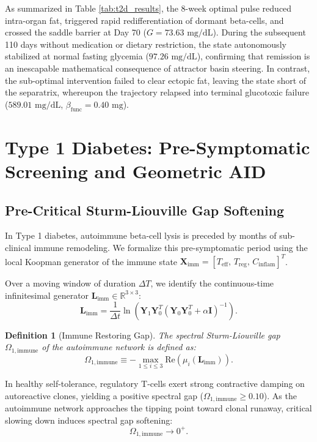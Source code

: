 \documentclass[11pt,a4paper]{article}
\newtheorem{definition}[theorem]{Definition}
\begin{document}
As summarized in Table \ref{tab:t2d_results}, the 8-week optimal pulse reduced intra-organ fat, triggered rapid redifferentiation of dormant beta-cells, and crossed the saddle barrier at Day 70 ($G = 73.63\text{ mg/dL}$). During the subsequent 110 days without medication or dietary restriction, the state autonomously stabilized at normal fasting glycemia ($97.26\text{ mg/dL}$), confirming that remission is an inescapable mathematical consequence of attractor basin steering. In contrast, the sub-optimal intervention failed to clear ectopic fat, leaving the state short of the separatrix, whereupon the trajectory relapsed into terminal glucotoxic failure ($589.01\text{ mg/dL}$, $\beta_{\mathrm{func}} = 0.40\text{ mg}$).

\section{Type 1 Diabetes: Pre-Symptomatic Screening and Geometric AID}

\subsection{Pre-Critical Sturm-Liouville Gap Softening}

In Type 1 diabetes, autoimmune beta-cell lysis is preceded by months of sub-clinical immune remodeling. We formalize this pre-symptomatic period using the local Koopman generator of the immune state $\bm{X}_{\mathrm{imm}} = [T_{\mathrm{eff}}, \, T_{\mathrm{reg}}, \, C_{\mathrm{inflam}}]^T$.

Over a moving window of duration $\Delta T$, we identify the continuous-time infinitesimal generator $\bm{L}_{\mathrm{imm}} \in \mathbb{R}^{3 \times 3}$:
\begin{equation}
\bm{L}_{\mathrm{imm}} = \frac{1}{\Delta t} \ln \left( \bm{Y}_1 \bm{Y}_0^T (\bm{Y}_0 \bm{Y}_0^T + \alpha \bm{I})^{-1} \right).
\end{equation}

\begin{definition}[Immune Restoring Gap]
The spectral Sturm-Liouville gap $\Omega_{1,\mathrm{immune}}$ of the autoimmune network is defined as:
\begin{equation}
\Omega_{1,\mathrm{immune}} \equiv -\max_{1 \le i \le 3} \mathrm{Re}\left( \mu_i(\bm{L}_{\mathrm{imm}}) \right).
\end{equation}
\end{definition}

In healthy self-tolerance, regulatory T-cells exert strong contractive damping on autoreactive clones, yielding a positive spectral gap ($\Omega_{1,\mathrm{immune}} \ge 0.10$). As the autoimmune network approaches the tipping point toward clonal runaway, critical slowing down induces spectral gap softening:
\begin{equation}
\Omega_{1,\mathrm{immune}} \to 0^+.
\end{equation}
\end{document}

